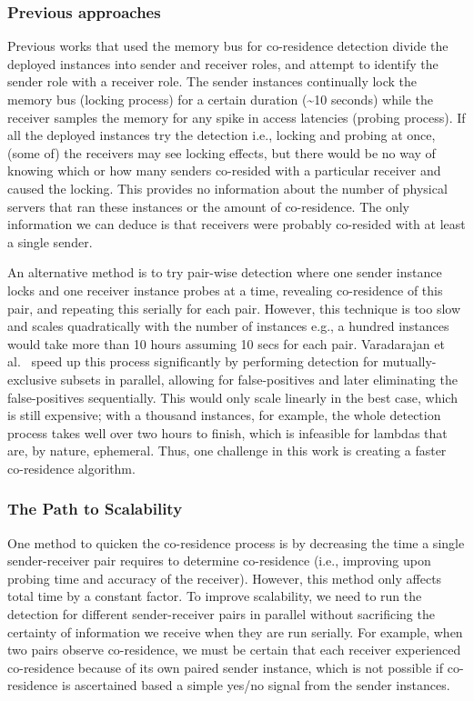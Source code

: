 \subsubsection{Previous approaches}
Previous works that used the memory bus for co-residence detection divide the
deployed instances into sender and receiver roles, and attempt to identify the
sender role with a receiver role. The sender instances continually lock the
memory bus (locking process) for a certain duration (\textasciitilde 10 seconds)
while the receiver samples the memory for any spike in access latencies (probing
process). If all the deployed instances try the detection i.e., locking and
probing at once, (some of) the receivers may see locking effects, but there
would be no way of knowing which or how many senders co-resided with a
particular receiver and caused the locking. This provides no information about
the number of physical servers that ran these instances or the amount of
co-residence. The only information we can deduce is that receivers were probably
co-resided with at least a single sender.

An alternative method is to try pair-wise detection where one sender instance
locks and one receiver instance probes at a time, revealing co-residence of this
pair, and repeating this serially for each pair. However, this technique is too
slow and scales quadratically with the number of instances e.g., a hundred
instances would take more than 10 hours assuming 10 secs for each pair.
Varadarajan et al.~\cite{varad191016} speed up this process significantly by
performing detection for mutually-exclusive subsets in parallel, allowing for
false-positives and later eliminating the false-positives sequentially. This
would only scale linearly in the best case, which is still expensive; with a
thousand instances, for example, the whole detection process takes well over two
hours to finish, which is infeasible for lambdas that are, by nature, ephemeral.
Thus, one challenge in this work is creating a faster co-residence
algorithm.

\subsubsection{The Path to Scalability}

One method to quicken the co-residence process is by decreasing the time a single
sender-receiver pair requires to determine co-residence (i.e., improving upon
probing time and accuracy of the receiver). However, this method only affects
total time by a constant factor. To improve scalability, we need to
run the detection for different sender-receiver pairs in parallel without
sacrificing the certainty of information we receive when they are run serially.  For
example, when two pairs observe co-residence, we must be certain that each
receiver experienced co-residence because of its own paired sender instance, which
is not possible if co-residence is ascertained based a simple yes/no signal from
the sender instances. 

